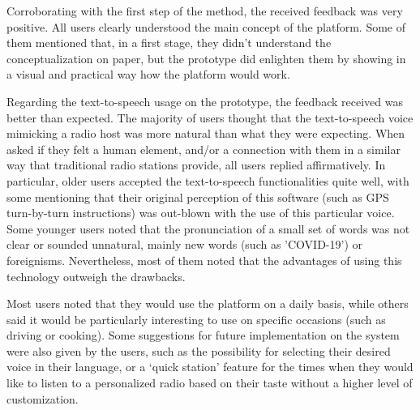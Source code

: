 Corroborating with the first step of the method, the received feedback was very positive. All users clearly understood the main concept of the platform. Some of them mentioned that, in a first stage, they didn't understand the conceptualization on paper, but the prototype did enlighten them by showing in a visual and practical way how the platform would work.

Regarding the text-to-speech usage on the prototype, the feedback received was better than expected. The majority of users thought that the text-to-speech voice mimicking a radio host was more natural than what they were expecting. When asked if they felt a human element, and/or a connection with them in a similar way that traditional radio stations provide, all users replied affirmatively. In particular, older users accepted the text-to-speech functionalities quite well, with some mentioning that their original perception of this software (such as GPS turn-by-turn instructions) was out-blown with the use of this particular voice. Some younger users noted that the pronunciation of a small set of words was not clear or sounded unnatural, mainly new words (such as 'COVID-19') or foreignisms. Nevertheless, most of them noted that the advantages of using this technology outweigh the drawbacks.

Most users noted that they would use the platform on a daily basis, while others said it would be particularly interesting to use on specific occasions (such as driving or cooking). Some suggestions for future implementation on the system were also given by the users, such as the possibility for selecting their desired voice in their language, or a ‘quick station’ feature for the times when they would like to listen to a personalized radio based on their taste without a higher level of customization.